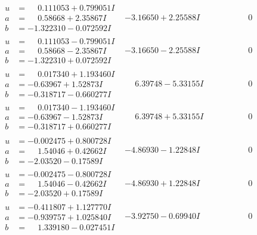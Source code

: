 \documentclass[1p]{elsarticle_modified}
\theoremstyle{definition}
\begin{document}
$$\begin{array}{c|c|c}
\begin{aligned}
u &= \phantom{-}0.111053 + 0.799051 I \\
a &= \phantom{-}0.58668 + 2.35867 I \\
b &= -1.322310 - 0.072592 I\end{aligned}
 & -3.16650 + 2.25588 I & \phantom{-0.000000 } 0 \\ \hline\begin{aligned}
u &= \phantom{-}0.111053 - 0.799051 I \\
a &= \phantom{-}0.58668 - 2.35867 I \\
b &= -1.322310 + 0.072592 I\end{aligned}
 & -3.16650 - 2.25588 I & \phantom{-0.000000 } 0 \\ \hline\begin{aligned}
u &= \phantom{-}0.017340 + 1.193460 I \\
a &= -0.63967 + 1.52873 I \\
b &= -0.318717 - 0.660277 I\end{aligned}
 & \phantom{-}6.39748 - 5.33155 I & \phantom{-0.000000 } 0 \\ \hline\begin{aligned}
u &= \phantom{-}0.017340 - 1.193460 I \\
a &= -0.63967 - 1.52873 I \\
b &= -0.318717 + 0.660277 I\end{aligned}
 & \phantom{-}6.39748 + 5.33155 I & \phantom{-0.000000 } 0 \\ \hline\begin{aligned}
u &= -0.002475 + 0.800728 I \\
a &= \phantom{-}1.54046 + 0.42662 I \\
b &= -2.03520 - 0.17589 I\end{aligned}
 & -4.86930 - 1.22848 I & \phantom{-0.000000 } 0 \\ \hline\begin{aligned}
u &= -0.002475 - 0.800728 I \\
a &= \phantom{-}1.54046 - 0.42662 I \\
b &= -2.03520 + 0.17589 I\end{aligned}
 & -4.86930 + 1.22848 I & \phantom{-0.000000 } 0 \\ \hline\begin{aligned}
u &= -0.411807 + 1.127770 I \\
a &= -0.939757 + 1.025840 I \\
b &= \phantom{-}1.339180 - 0.027451 I\end{aligned}
 & -3.92750 - 0.69940 I & \phantom{-0.000000 } 0 \\ \hline\begin{aligned}

\end{aligned}
\end{array}$$
\end{document}
